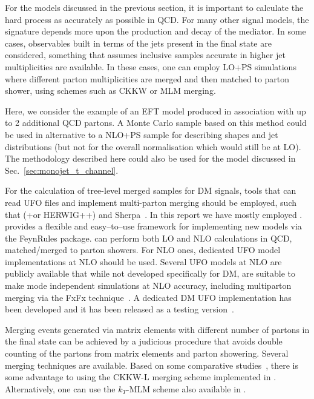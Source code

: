 For the models discussed in the previous section, it is important
to calculate the hard process as accurately as possible in QCD.
For many other signal models, the \MET{} signature depends more
upon the production and decay of the mediator. In some cases, observables
built in terms of the jets present in the final state are considered, something that assumes inclusive samples accurate in higher jet multiplicities are available.  In these cases, one can employ LO+PS simulations where different parton multiplicities are merged and then matched to parton shower, using schemes such as CKKW or MLM merging.

Here, we consider the example of an EFT model produced in association
with up to 2 additional QCD partons.   A Monte Carlo sample based on
this method could be used in alternative to a NLO+PS sample for describing shapes 
and jet distributions (but not for the overall normalisation which would still be at LO).
The methodology described here could also be used for the \tchannel model
discussed in Sec.~\ref{sec:monojet_t_channel}.

For the calculation of tree-level merged samples for DM signals, tools that can  
read UFO files and implement multi-parton merging should be employed, such 
that \madgraph (+\pythiaEight or {\sc HERWIG++}) and {\sc Sherpa}~\cite{Hoche:2014kca}.
In this report we have mostly employed \madgraph. 
\madgraph provides a flexible and easy--to--use framework for implementing
new models via the {\sc FeynRules} package.
\madgraph can perform both LO and NLO calculations in QCD, matched/merged to parton showers. For NLO ones, dedicated UFO model implementations at NLO should be used. Several UFO models at NLO are publicly available that while not developed specifically for DM, are suitable to make mode independent simulations at NLO accuracy, including multiparton merging 
via the FxFx technique~\cite{Frederix:2012ps}. A dedicated DM UFO implementation 
has been developed and it has been released as a testing version~\cite{NewMadgraphModels}.

Merging events generated via matrix elements with different number of partons in the final state can be achieved by a judicious procedure that  avoids double counting of the partons from matrix elements and parton showering.
Several merging techniques are available. Based on some comparative studies \,\cite{Alwall:0706.2569}, there is some advantage to using the CKKW-L merging scheme \cite{Lonnblad:2011xx} implemented in \pythiaEight.  Alternatively, one can use the $k_T$-MLM scheme also available in \pythiaEight.

